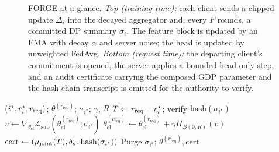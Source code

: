\begin{figure}[t]
{%
}
\caption{FORGE at a glance. \emph{Top (training time):} each client sends a
clipped update $\Delta_i$ into the decayed aggregator and, every $F$ rounds, a
committed DP summary $\sigma_i$. The feature block is updated by an EMA with
decay $\alpha$ and server noise; the head is updated by unweighted FedAvg.
\emph{Bottom (request time):} the departing client's commitment is opened, the
server applies a bounded head-only step, and an audit certificate carrying the
composed GDP parameter and the hash-chain transcript is emitted for the
authority to verify.}
\label{fig:forge-schematic}
\end{figure}

\begin{algorithm}[t]
\footnotesize
\caption{FORGE non-interactive erasure.}
\label{alg:erasure}
\begin{algorithmic}[1]
\Require $(i^\star, r_i^{\star}, r_\mathrm{req})$; $\theta^{(r_\mathrm{req})}$; $\sigma_{i^\star}$; $\gamma$, $R$
\State $T \gets r_\mathrm{req} - r_i^{\star}$; verify $\mathrm{hash}(\sigma_{i^\star})$
\State $v \gets \nabla_{\theta_\mathrm{cl}} \mathcal{L}_\mathrm{sub}(\theta_\mathrm{cl}^{(r_\mathrm{req})}; \sigma_{i^\star})$
\State $\theta_\mathrm{cl}^{(r_\mathrm{req})} \gets \theta_\mathrm{cl}^{(r_\mathrm{req})} + \gamma \Pi_{B(0, R)}(v)$
\State $\mathrm{cert} \gets (\mu_\mathrm{joint}(T), \delta_\sigma, \mathrm{hash}(\sigma_{i^\star}))$ 
\State Purge $\sigma_{i^\star}$; \Return $\theta^{(r_\mathrm{req})}, \mathrm{cert}$
\end{algorithmic}
\end{algorithm}

